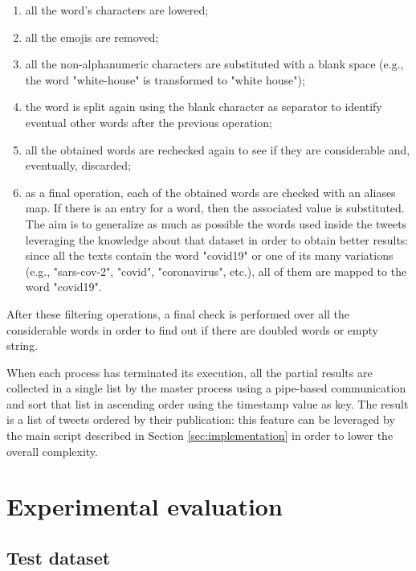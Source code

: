 \begin{description}
	\begin{enumerate}
		\item all the word's characters are lowered;
		\item all the emojis are removed;
		\item all the non-alphanumeric characters are substituted with a blank space (e.g., the word "white-house" is transformed to "white house");
		\item the word is split again using the blank character as separator to identify eventual other words after the previous operation;
		\item all the obtained words are rechecked again to see if they are considerable and, eventually, discarded;
		\item as a final operation, each of the obtained words are checked with an aliases map. If there is an entry for a word, then the associated value is substituted. The aim is to generalize as much as possible the words used inside the tweets leveraging the knowledge about that dataset in order to obtain better results: since all the texts contain the word "covid19" or one of its many variations (e.g., "sars-cov-2", "covid", "coronavirus", etc.), all of them are mapped to the word "covid19".
	\end{enumerate}
	After these filtering operations, a final check is performed over all the considerable words in order to find out if there are doubled words or empty string. 
\end{description}

When each process has terminated its execution, all the partial results are collected in a single list by the master process using a pipe-based communication and sort that list in ascending order using the timestamp value as key. The result is a list of tweets ordered by their publication: this feature can be leveraged by the main script described in Section \ref{sec:implementation} in order to lower the overall complexity.

\section{Experimental evaluation}
\label{sec:experimental_evaluation}

\subsection{Test dataset}
\label{subsec:test_dataset}
